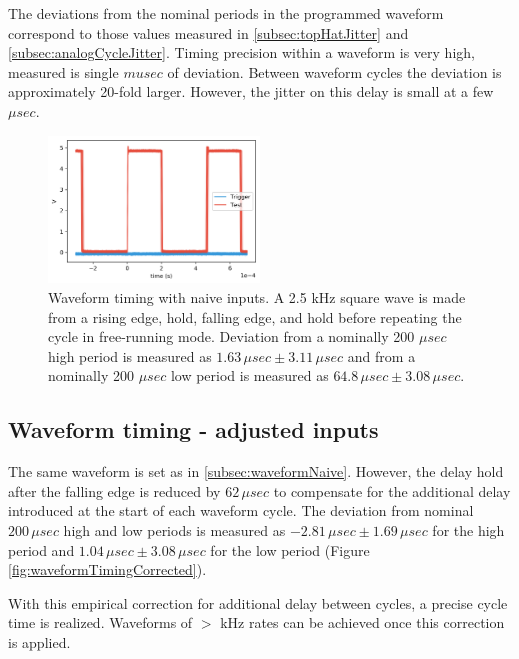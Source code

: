 \documentclass[10pt,a4paper]{article}
\begin{document}
The deviations from the nominal periods in the programmed waveform correspond to those values measured in \ref{subsec:topHatJitter} and \ref{subsec:analogCycleJitter}. Timing precision within a waveform is very high, measured is single $mu sec$ of deviation.  Between waveform cycles the deviation is approximately 20-fold larger. However, the jitter on this delay is small at a few $\mu sec$.  

\begin{figure}
	\centering
	\includegraphics[width=0.5\textwidth]{../output/waveformNaive.png}
	\caption[waveformNaive]{Waveform timing with naive inputs. A 2.5 kHz square wave is made from a rising edge, hold, falling edge, and hold before repeating the cycle in free-running mode. Deviation from a nominally 200 $\mu sec$ high period is measured as $1.63 \, \mu sec \pm 3.11 \, \mu sec$ and from a nominally 200 $\mu sec$ low period is measured as $64.8\, \mu sec \pm 3.08 \, \mu sec$.\newline}
	\label{fig:waveformTimingNative}
\end{figure}

\subsection{Waveform timing - adjusted inputs}

The same waveform is set as in \ref{subsec:waveformNaive}.  However, the delay hold after the falling edge is reduced by $62\, \mu sec$ to compensate for the additional delay introduced at the start of each waveform cycle.  The deviation from nominal $200\,\mu sec$ high and low periods is measured as $-2.81 \, \mu sec \pm 1.69 \, \mu sec$ for the high period and $1.04 \, \mu sec \pm 3.08\, \mu sec$ for the low period (Figure \ref{fig:waveformTimingCorrected}).

With this empirical correction for additional delay between cycles, a precise cycle time is realized.  Waveforms of $>$ kHz rates can be achieved once this correction is applied. 
\end{document}
